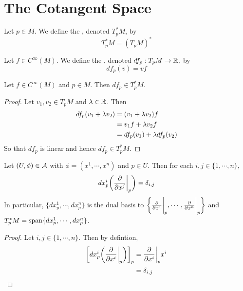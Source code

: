 \documentclass{book}
\begin{document}
	
	
	
	
	
	
	\newpage
	\section{The Cotangent Space}	
	
	
	\begin{defn}
	Let $p \in M$. We define the , denoted $T^*_pM$, by $$T^*_pM = (T_pM)^*$$
	\end{defn}
	
	\begin{defn}
	Let $f \in C^{\infty}(M)$. We define the , denoted $df_p:T_pM \rightarrow \mathbb{R}$, by $$df_p(v) = vf$$
	\end{defn}
	
	\begin{ex}
	Let $f \in C^{\infty}(M)$ and $p \in M$. Then $df_p \in T^*_pM$.
	\end{ex}
	
	\begin{proof}
	Let $v_1, v_2 \in T_pM$ and $\lambda \in \mathbb{R}$. Then 
	\begin{align*}
	df_p(v_1 + \lambda v_2) 
	&= (v_1 + \lambda v_2) f \\
	&= v_1 f + \lambda v_2 f \\
	&= df_p(v_1) + \lambda df_p(v_2)
	\end{align*}
	So that $df_p$ is linear and hence $df_p \in T^*_pM$.
	\end{proof}
	
	\begin{ex}
		Let $(U, \phi) \in \mathcal{A}$ with $\phi = (x^1, \cdots, x^n)$ and $p \in U$. Then for each $i,j \in \{1, \cdots, n\}$, $$dx^i_p \bigg(\frac{\partial }{\partial x^j} \bigg|_p \bigg) = \delta_{i,j}$$ 
		In particular, $\{dx^1_p, \cdots, dx^n_p \}$ is the dual basis to $\bigg \{ \frac{\partial}{\partial x^1} \bigg|_p, \cdots, \frac{\partial}{\partial x^n} \bigg|_p \bigg \}$ and $T_p^*M = \operatorname{span}\{dx^1_p, \cdots, dx^n_p\}$.
	\end{ex}

	\begin{proof}
		Let $i,j \in \{1, \cdots, n\}$. Then  by defintion,
		\begin{align*}
			\bigg[ dx^i_p \bigg (\frac{\partial}{\partial x^i} \bigg|_p \bigg ) \bigg]_p 
			&= \frac{\partial}{\partial x^i} \bigg|_p x^i \\
			&= \delta_{i,j} \\
		\end{align*}
	\end{proof}
	
\end{document}
